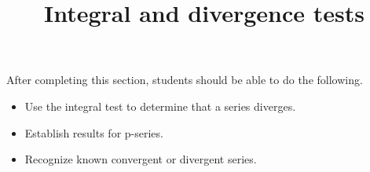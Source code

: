 \documentclass{ximera}
\title{Integral and divergence tests}
\begin{document}
\begin{abstract}
\end{abstract}

\maketitle

\begin{sectionOutcomes}

After completing this section, students should be able to do the following.

\begin{itemize}
\item Use the integral test to determine that a series diverges.
\item Establish results for p-series.
\item Recognize known convergent or divergent series.
\end{itemize}

\end{sectionOutcomes}
\end{document}

